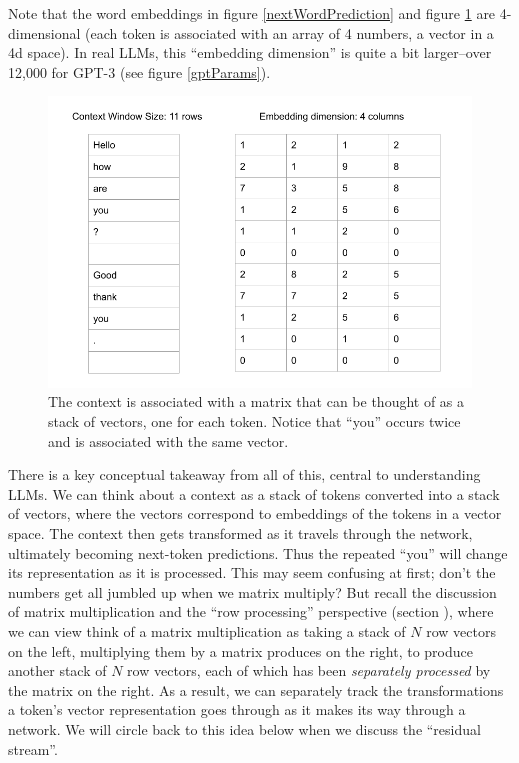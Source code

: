 Note that the word embeddings in figure \ref{nextWordPrediction} and figure
\ref{sequenceDim} are 4-dimensional (each token is associated with an array of
4 numbers, a vector in a 4d space). In real LLMs, this ``embedding dimension''
is quite a bit larger--over 12,000 for GPT-3 (see figure \ref{gptParams}).

\begin{figure}[ht]
\centering
\includegraphics[scale=.45]{./images/contextWindowAsStack.png}
\caption[Jeff Yoshimi]{The context is associated with a matrix that can
be thought of as a stack of vectors, one for each token. Notice that ``you''
occurs twice and is associated with the same vector.
}
\label{sequenceDim}
\end{figure}

There is a key conceptual takeaway from all of this, central to understanding
LLMs. We can think about a context as a stack of tokens converted into a stack
of vectors, where the vectors correspond to embeddings of the tokens in a
vector space. The context then gets transformed as it travels through the
network, ultimately becoming next-token predictions. Thus the repeated ``you''
will change its representation as it is processed. This may seem confusing at
first; don't the numbers get all jumbled up when we matrix multiply? But recall
the discussion of matrix multiplication and the ``row processing'' perspective
(section ), where we can view think of a matrix
multiplication as taking a stack of $N$ row vectors on the left, multiplying
them by a matrix produces on the right, to produce another stack of $N$ row
vectors, each of which has been \emph{separately processed} by the matrix on
the right. As a result, we can separately track the transformations a token's
vector representation goes through as it makes its way through a network.  We
will circle back to this idea below when we discuss the ``residual stream''.

